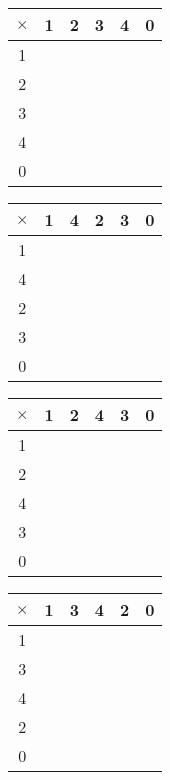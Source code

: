\begin{ejercicio}
 \begin{tabular}{|c||c|c|c|c|c|} 
 \hline
  $\times$ & 1 & 2 & 3 & 4 & 0\\ 
  \hline
  \hline
  1 &  & & & & \\ 
  \hline
  2 &  & & & &\\
    \hline
  3 &  & & & & \\
      \hline
  4 &  & & & & \\ 
        \hline
  0 &  & & & & \\ 
  \hline
\end{tabular}
\hspace{.5cm}
\begin{tabular}{|c||c|c|c|c|c|} 
 \hline
  $\times$ & 1 & 4 & 2 & 3 & 0\\ 
  \hline
  \hline
  1 &  & & & & \\ 
  \hline
  4 &  & & & &\\
    \hline
  2 &  & & & & \\
      \hline
  3 &  & & & & \\ 
        \hline
  0 &  & & & & \\ 
  \hline
\end{tabular}
\hspace{.5cm}
\begin{tabular}{|c||c|c|c|c|c|} 
 \hline
  $\times$ & 1 & 2 & 4 & 3 & 0\\ 
  \hline
  \hline
  1 &  & & & & \\ 
  \hline
  2 &  & & & &\\
    \hline
  4 &  & & & & \\
      \hline
  3 &  & & & & \\ 
        \hline
  0 &  & & & & \\ 
  \hline
\end{tabular}
\hspace{.5cm}
\begin{tabular}{|c||c|c|c|c|c|} 
 \hline
  $\times$ & 1 & 3 & 4 & 2 & 0\\ 
  \hline
  \hline
  1 &  & & & & \\ 
  \hline
  3 &  & & & &\\
    \hline
  4 &  & & & & \\
      \hline
  2 &  & & & & \\ 
        \hline
  0 &  & & & & \\ 
  \hline
\end{tabular}    
\end{ejercicio}

